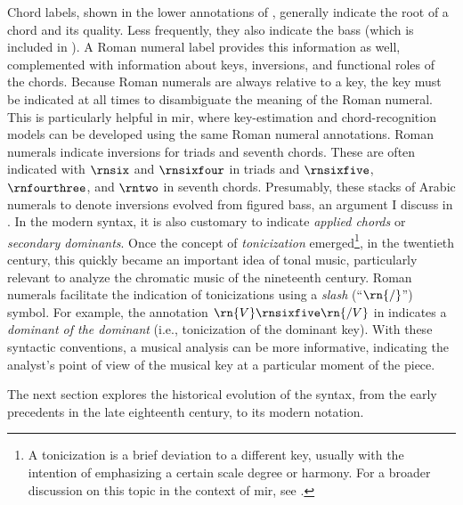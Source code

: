

Chord labels, shown in the lower annotations of
, generally indicate the root of a chord and
its quality. Less frequently, they also indicate the bass
(which is included in ). A Roman numeral
label provides this information as well, complemented with
information about keys, inversions, and functional roles of
the chords. Because Roman numerals are always relative to a
key, the key must be indicated at all times to disambiguate
the meaning of the Roman numeral. This is particularly
helpful in \gls{mir}, where key-estimation and
chord-recognition models can be developed using the same
Roman numeral annotations. Roman numerals indicate
inversions for triads and seventh chords. These are often
indicated with $\rnsix$ and $\rnsixfour$ in triads and
$\rnsixfive$, $\rnfourthree$, and $\rntwo$ in seventh
chords. Presumably, these stacks of Arabic numerals to
denote inversions evolved from figured bass, an argument I
discuss in . In the
modern syntax, it is also customary to indicate
\emph{applied chords} or \emph{secondary dominants}. Once
the concept of \emph{tonicization} emerged\footnote{A
tonicization is a brief deviation to a different key,
usually with the intention of emphasizing a certain scale
degree or harmony. For a broader discussion on this topic in
the context of \gls{mir}, see
\textcite{napoleslopez2020local}.}, in the twentieth
century, this quickly became an important idea of tonal
music, particularly relevant to analyze the chromatic music
of the nineteenth century. Roman numerals facilitate the
indication of tonicizations using a \emph{slash}
(``$\rn{/}$'') symbol. For example, the annotation
$\rn{V}\rnsixfive\rn{/V}$ in  indicates a
\emph{dominant of the dominant} (i.e., tonicization of the
dominant key). With these syntactic conventions, a musical
analysis can be more informative, indicating the analyst's
point of view of the musical key at a particular moment of
the piece.

The next section explores the historical evolution of the
syntax, from the early precedents in the late eighteenth
century, to its modern notation.


